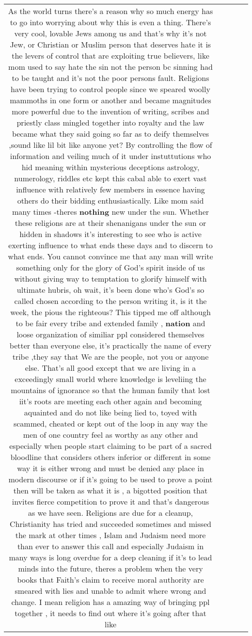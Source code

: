 \documentclass[11pt]{article}
\newlength\mylength
\begin{document}
\begin{center}
\begin{longtable}{|C{.65\mylength}|C{.30\mylength}|C{.12\mylength}|C{.12\mylength}|C{.12\mylength}|}
  \small As the world turns there's a reason why so much energy has to go into worrying about why this is even a thing. There's very cool, lovable Jews among us and that's why it's not Jew, or Christian or Muslim person that deserves hate it is the levers of control that are exploiting true believers, like mom used to say hate the sin not the person bc sinning had to be taught and it's not the poor persons fault. Religions have been trying to control people since we speared woolly mammoths in one form or another and became magnitudes more powerful due to the invention of writing, scribes and priestly class mingled together into royalty and the law became what they said going so far as to deify themselves ,sound like lil bit like anyone yet? By controlling the flow of information and veiling much of it under instuttutions who hid meaning within mysterious deceptions astrology, numerology, riddles etc kept this cabal able to exert vast influence with relatively few members in essence having others do their bidding enthusiastically. Like mom said many times -theres \textbf{nothing} new under the sun. Whether these religions are at their shenanigans under the sun or hidden in shadows it's interesting to see who is active exerting influence to what ends these days and to discern to what ends. You cannot convince me that any man will write something only for the glory of God's spirit inside of us without giving way to temptation to glorify himself with ultimate hubris, oh wait, it's been done who's God's so called chosen according to the person writing it, is it the week, the pious the righteous? This tipped me off although to be fair every tribe and extended family , \textbf{nation} and loose organization of similiar ppl considered themselves better than everyone else, it's practically the name of every tribe ,they say that We are the people, not you or anyone else. That's all good except that we are living in a exceedingly small world where knowledge is leveliing the mountains of ignorance so that the human family that lost iit's roots are meeting each other again and becoming aquainted and do not like being lied to, toyed with scammed, cheated or kept out of the loop in any way the men of one country feel as worthy as any other and especially when people start claiming to be part of a sacred bloodline that considers others inferior or different in some way it is either wrong and must be denied any place in modern discourse or if it's going to be used to prove a point then will be taken as what it is , a bigotted position that invites fierce competition to prove it and that's dangerous as we have seen. Religions are due for a cleanup, Christianity has tried and succeeded sometimes and missed the mark at other times , Islam and Judaism need more than ever to answer this call and especially Judaism in many ways is long overdue for a deep cleaning if it's to lead minds into the future, theres a problem when the very books that  Faith's claim to receive moral authority are smeared with lies and unable to admit where wrong and change. I mean religion has a amazing way of bringing ppl together , it needs to find out where it's going after that like 
\end{longtable}
\end{center}
\end{document}
